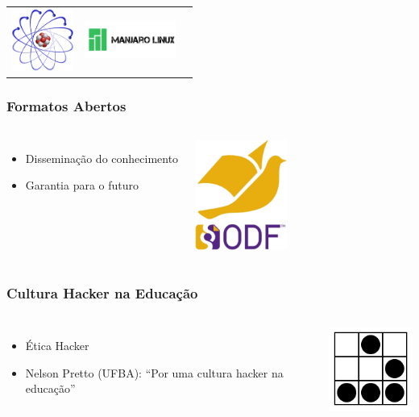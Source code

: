 \documentclass{beamer}
\begin{document}
\begin{frame}
\begin{center}
\begin{tabular}{c c c}
       \includegraphics[width=2cm]{images/Scientific_Linux_logo.png} & \includegraphics[width=3cm]{images/manjaro.png} & 
     \end{tabular}
   \end{center}
\end{frame}


\begin{frame}
  \frametitle{Formatos Abertos}
  \begin{columns}
    \column{7cm}
    \begin{itemize}
    \item Disseminação do conhecimento
    \item Garantia para o futuro
    \end{itemize}
    \column{4cm}
    \begin{center}
      \includegraphics[width=3cm]{images/opendocumentformat.png}
    \end{center}
  \end{columns}
\end{frame}

\begin{frame}
  \frametitle{Cultura Hacker na Educação}
  \begin{columns}
    \column{8cm}
    \begin{itemize}
    \item Ética Hacker
    \item Nelson Pretto (UFBA): ``Por uma cultura hacker na educação''
    \end{itemize}
    \column{3cm}
    \includegraphics[width=3cm]{images/glider.png}
  \end{columns}
\end{frame}
\end{document}
